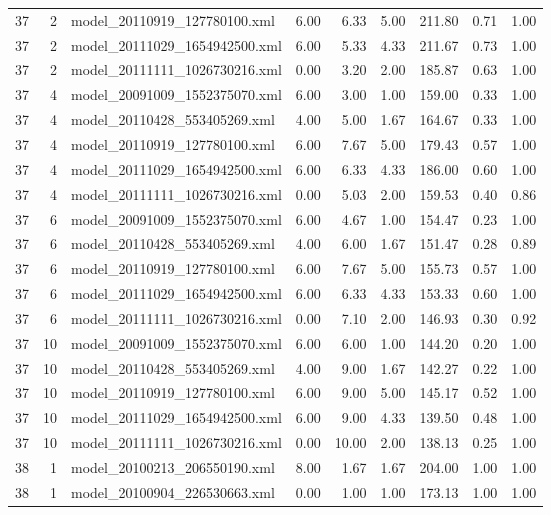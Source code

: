 \begin{table}[ht]
\begin{tabular}{rrlrrrrrr}
   37 &   2 & model\_20110919\_127780100.xml & 6.00 & 6.33 & 5.00 & 211.80 & 0.71 & 1.00 \\ 
   37 &   2 & model\_20111029\_1654942500.xml & 6.00 & 5.33 & 4.33 & 211.67 & 0.73 & 1.00 \\ 
   37 &   2 & model\_20111111\_1026730216.xml & 0.00 & 3.20 & 2.00 & 185.87 & 0.63 & 1.00 \\ 
   37 &   4 & model\_20091009\_1552375070.xml & 6.00 & 3.00 & 1.00 & 159.00 & 0.33 & 1.00 \\ 
   37 &   4 & model\_20110428\_553405269.xml & 4.00 & 5.00 & 1.67 & 164.67 & 0.33 & 1.00 \\ 
   37 &   4 & model\_20110919\_127780100.xml & 6.00 & 7.67 & 5.00 & 179.43 & 0.57 & 1.00 \\ 
   37 &   4 & model\_20111029\_1654942500.xml & 6.00 & 6.33 & 4.33 & 186.00 & 0.60 & 1.00 \\ 
   37 &   4 & model\_20111111\_1026730216.xml & 0.00 & 5.03 & 2.00 & 159.53 & 0.40 & 0.86 \\ 
   37 &   6 & model\_20091009\_1552375070.xml & 6.00 & 4.67 & 1.00 & 154.47 & 0.23 & 1.00 \\ 
   37 &   6 & model\_20110428\_553405269.xml & 4.00 & 6.00 & 1.67 & 151.47 & 0.28 & 0.89 \\ 
   37 &   6 & model\_20110919\_127780100.xml & 6.00 & 7.67 & 5.00 & 155.73 & 0.57 & 1.00 \\ 
   37 &   6 & model\_20111029\_1654942500.xml & 6.00 & 6.33 & 4.33 & 153.33 & 0.60 & 1.00 \\ 
   37 &   6 & model\_20111111\_1026730216.xml & 0.00 & 7.10 & 2.00 & 146.93 & 0.30 & 0.92 \\ 
   37 &  10 & model\_20091009\_1552375070.xml & 6.00 & 6.00 & 1.00 & 144.20 & 0.20 & 1.00 \\ 
   37 &  10 & model\_20110428\_553405269.xml & 4.00 & 9.00 & 1.67 & 142.27 & 0.22 & 1.00 \\ 
   37 &  10 & model\_20110919\_127780100.xml & 6.00 & 9.00 & 5.00 & 145.17 & 0.52 & 1.00 \\ 
   37 &  10 & model\_20111029\_1654942500.xml & 6.00 & 9.00 & 4.33 & 139.50 & 0.48 & 1.00 \\ 
   37 &  10 & model\_20111111\_1026730216.xml & 0.00 & 10.00 & 2.00 & 138.13 & 0.25 & 1.00 \\ 
   38 &   1 & model\_20100213\_206550190.xml & 8.00 & 1.67 & 1.67 & 204.00 & 1.00 & 1.00 \\ 
   38 &   1 & model\_20100904\_226530663.xml & 0.00 & 1.00 & 1.00 & 173.13 & 1.00 & 1.00 \\ 

\end{tabular}
\end{table}
